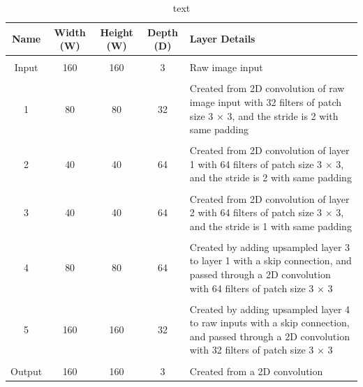 \documentclass[a4paper]{article}
\begin{document}
\begin{table}[h]
\centering
\caption{text}\scriptsize
\begin{tabular}{ccccp{8cm}}
\toprule
\textbf{Name} & \textbf{Width (W)} & \textbf{Height (W)} & \textbf{Depth (D)} & Layer Details\\  
\midrule
 & & & &\\
Input & 160 & 160 & 3 & Raw image input\\
 & & & &\\
1 & 80 & 80 & 32 & Created from 2D convolution of raw image input with 32 filters of patch size 3 $\times $ 3, and the stride is 2 with same padding\\
 & & & &\\
2 & 40 & 40 & 64 & Created from 2D convolution of layer 1 with 64 filters of patch size 3 $\times $ 3, and the stride is 2 with same padding\\
 & & & &\\
3 & 40 & 40 & 64 & Created from 2D convolution of layer 2 with 64 filters of patch size 3 $\times$ 3, and the stride is 1 with same padding\\
 & & & &\\
4 & 80 & 80 & 64 & Created by adding upsampled layer 3 to layer 1 with a skip connection, and passed through a 2D convolution with 64 filters of patch size 3 $\times$ 3\\
 & & & &\\
5 & 160 & 160 & 32 & Created by adding upsampled layer 4 to raw inputs with a skip connection, and passed through a 2D convolution with 32 filters of patch size 3 $\times$ 3\\
& & & &\\
Output & 160 & 160 & 3 & Created from a 2D convolution\\
\bottomrule
\end{tabular}
\end{table}

\clearpage
\end{document}
